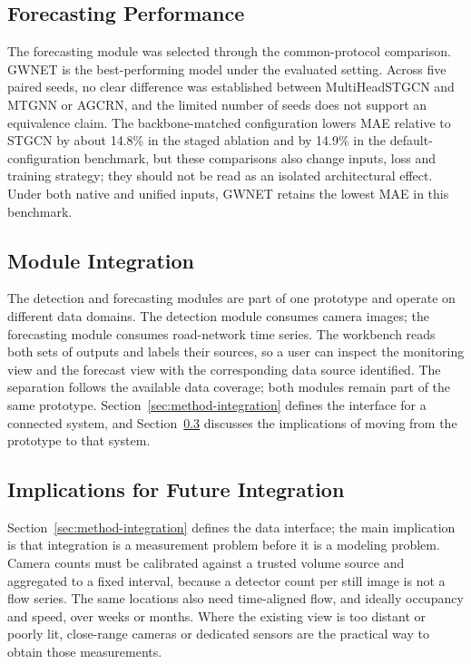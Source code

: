 \subsection{Forecasting Performance}\label{sec:discussion-forecasting}

The forecasting module was selected through the common-protocol comparison.
GWNET is the best-performing model under the evaluated setting. Across five
paired seeds, no clear difference was established between MultiHeadSTGCN and
MTGNN or AGCRN, and the limited number of seeds does not support an equivalence
claim. The backbone-matched configuration lowers MAE relative to STGCN by about
14.8\% in the staged ablation and by 14.9\% in the default-configuration
benchmark, but these comparisons also change inputs, loss and training strategy;
they should not be read as an isolated architectural effect. Under both native
and unified inputs, GWNET retains the lowest MAE in this benchmark.

\subsection{Module Integration}\label{sec:discussion-integration}

The detection and forecasting modules are part of one prototype and operate on
different data domains. The detection module consumes camera images; the
forecasting module consumes road-network time series. The workbench reads both
sets of outputs and labels their sources, so a user can inspect the monitoring
view and the forecast view with the corresponding data source identified. The
separation follows the available data coverage; both modules remain part of the
same prototype. Section~\ref{sec:method-integration} defines the interface for a
connected system, and Section~\ref{sec:discussion-roadmap} discusses the
implications of moving from the prototype to that system.

\subsection{Implications for Future Integration}\label{sec:discussion-roadmap}

Section~\ref{sec:method-integration} defines the data interface; the main
implication is that integration is a measurement problem before it is a modeling
problem. Camera counts must be calibrated against a trusted volume source and
aggregated to a fixed interval, because a detector count per still image is not a
flow series. The same locations also need time-aligned flow, and ideally
occupancy and speed, over weeks or months. Where the existing view is too distant
or poorly lit, close-range cameras or dedicated sensors are the practical way to
obtain those measurements.

